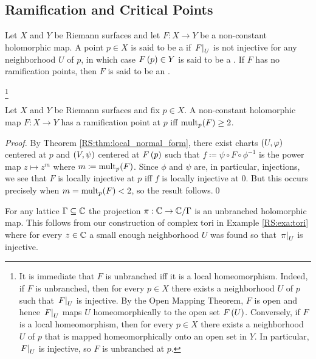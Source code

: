 \documentclass[../Moduli_Spaces_of_Riemann_Surfaces.tex]{subfiles}
\begin{document}
    \subsection{Ramification and Critical Points}
    \begin{definition}
        Let $X$ and $Y$ be Riemann surfaces and let $F:X\to Y$ be a non-constant holomorphic map. A point $p\in X$ is said to be a  if $\left.F\right|_U$ is not injective for any neighborhood $U$ of $p$, in which case $F\left(p\right)\in Y$ is said to be a . If $F$ has no ramification points, then $F$ is said to be an .
    \end{definition}
    \footnote{It is immediate that $F$ is unbranched iff it is a local homeomorphism. Indeed, if $F$ is unbranched, then for every $p\in X$ there exists a neighborhood $U$ of $p$ such that $\left.F\right|_U$ is injective. By the Open Mapping Theorem, $F$ is open and hence $\left.F\right|_U$ maps $U$ homeomorphically to the open set $F\left(U\right)$. Conversely, if $F$ is a local homeomorphism, then for every $p\in X$ there exists a neighborhood $U$ of $p$ that is mapped homeomorphically onto an open set in $Y$. In particular, $\left.F\right|_U$ is injective, so $F$ is unbranched at $p$.}
    \begin{proposition}\label{CS:prp:ramification_iff_mult_2}
        Let $X$ and $Y$ be Riemann surfaces and fix $p\in X$. A non-constant holomorphic map $F:X\to Y$ has a ramification point at $p$ iff $\operatorname{mult}_p\!\left(F\right)\geq2$.
    \end{proposition}
    \begin{proof}
        By Theorem \ref{RS:thm:local_normal_form}, there exist charts $\left(U,\varphi\right)$ centered at $p$ and $\left(V,\psi\right)$ centered at $F\left(p\right)$ such that $f\coloneqq\psi\circ F\circ\phi^{-1}$ is the power map $z\mapsto z^m$ where $m\coloneqq\operatorname{mult}_p\!\left(F\right)$. Since $\phi$ and $\psi$ are, in particular, injections, we see that $F$ is locally injective at $p$ iff $f$ is locally injective at $0$. But this occurs precisely when $m=\operatorname{mult}_p\!\left(F\right)<2$, so the result follows.\qed
    \end{proof}
    \begin{example}\label{CS:exa:covering_of_torus}
        For any lattice $\Gamma\subseteq\mathbb{C}$ the projection $\pi:\mathbb{C}\to\mathbb{C}/\Gamma$ is an unbranched holomorphic map. This follows from our construction of complex tori in Example \ref{RS:exa:tori} where for every $z\in\mathbb{C}$ a small enough neighborhood $U$ was found so that $\left.\pi\right|_U$ is injective.\exqed
    \end{example}
\end{document}
